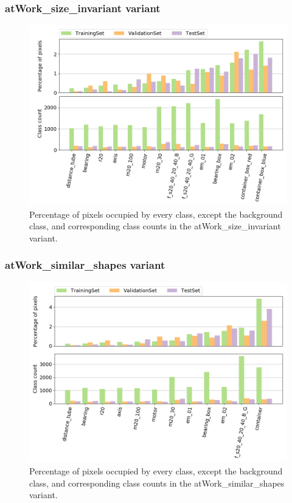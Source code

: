	\subsubsection{atWork\_size\_invariant variant}
		
		\begin{figure}
		\centering
			\includegraphics[scale=0.5]{images/size_noB}
			\caption{Percentage of pixels occupied by every class, except the background class, and corresponding class counts in the atWork\_size\_invariant variant.}
			\label{Fig:ana_size}
		\end{figure}
		
	\subsubsection{atWork\_similar\_shapes variant}
		
		\begin{figure}
		\centering
			\includegraphics[scale=0.5]{images/shape_noB}
			\caption{Percentage of pixels occupied by every class, except the background class, and corresponding class counts in the atWork\_similar\_shapes variant.}
			\label{Fig:ana_shape}
		\end{figure}
	

